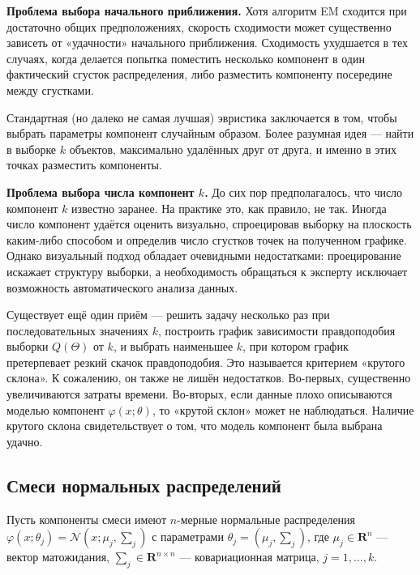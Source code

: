     \vspace{\baselineskip}
    \textbf{Проблема выбора начального приближения.} Хотя алгоритм EM сходится при достаточно общих предположениях, скорость сходимости может существенно зависеть от «удачности» начального приближения. Сходимость ухудшается в тех случаях, когда делается попытка поместить несколько компонент в один фактический сгусток распределения, либо разместить компоненту посередине между сгустками.
    
    Стандартная (но далеко не самая лучшая) эвристика заключается в том, чтобы выбрать параметры компонент случайным образом. Более разумная идея --- найти в выборке $k$ объектов, максимально удалённых друг от друга, и именно в этих точках разместить компоненты.
    
    \vspace{\baselineskip}
    \textbf{Проблема выбора числа компонент $k$.} До сих пор предполагалось, что число компонент $k$ известно заранее. На практике это, как правило, не так. Иногда число компонент удаётся оценить визуально, спроецировав выборку на плоскость каким-либо способом и определив число сгустков точек на полученном графике. Однако визуальный подход обладает очевидными недостатками: проецирование искажает структуру выборки, а необходимость обращаться к эксперту исключает возможность автоматического анализа данных.
    
    Существует ещё один приём --- решить задачу несколько раз при последовательных значениях $k$, построить график зависимости правдоподобия выборки $Q(\Theta)$ от $k$, и выбрать наименьшее $k$, при котором график претерпевает резкий скачок правдоподобия. Это называется критерием «крутого склона». К сожалению, он также не лишён недостатков. Во-первых, существенно увеличиваются затраты времени. Во-вторых, если данные плохо описываются моделью компонент $\varphi(x; \theta)$, то «крутой склон» может не наблюдаться. Наличие крутого склона свидетельствует о том, что модель компонент была выбрана удачно.

    \subsection{Смеси нормальных распределений}
    
    Пусть компоненты смеси имеют $n$-мерные нормальные распределения $\varphi(x; \theta_j) = \mathcal{N}(x; \mu_j, \sum_j)$ с параметрами $\theta_j = (\mu_j, \sum_j)$, где $\mu_j \in \mathbf{R}^n$ --- вектор матожидания, $\sum_j \in \mathbf{R}^{n \times n}$ --- ковариационная матрица, $j = 1, \dots, k$.
    

